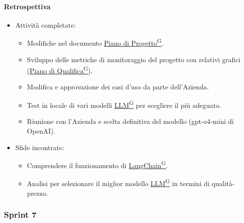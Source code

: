 \documentclass{article}
\begin{document}
                \paragraph{Retrospettiva}
                \begin{itemize}
                    \item Attività completate:
                    \begin{itemize}
                        \item Modifiche nel documento \href{https://code7crusaders.github.io/docs/PB/documentazione_interna/glossario.html#piano-di-progetto}{Piano di Progetto\textsuperscript{G}}.
                        \item Sviluppo delle metriche di monitoraggio del progetto con relativi grafici (\href{https://code7crusaders.github.io/docs/PB/documentazione_interna/glossario.html#piano-di-qualifica}{Piano di Qualifica\textsuperscript{G}}).
                        \item Modifica e approvazione dei casi d'uso da parte dell'Azienda.
                        \item Test in locale di vari modelli \href{https://code7crusaders.github.io/docs/PB/documentazione_interna/glossario.html#llm-large-language-model}{LLM\textsuperscript{G}} per scegliere il più adeguato.
                        \item Riunione con l'Azienda e scelta definitiva del modello (gpt-o4-mini di OpenAI).
                    \end{itemize}
                    \item Sfide incontrate:
                    \begin{itemize}
                        \item Comprendere il funzionamento di \href{https://code7crusaders.github.io/docs/PB/documentazione_interna/glossario.html#langchain}{LangChain\textsuperscript{G}}.
                        \item Analisi per selezionare il miglior modello \href{https://code7crusaders.github.io/docs/PB/documentazione_interna/glossario.html#llm-large-language-model}{LLM\textsuperscript{G}} in termini di qualità-prezzo.
                    \end{itemize}
                \end{itemize}
            \subsubsection{Sprint 7}
\end{document}
